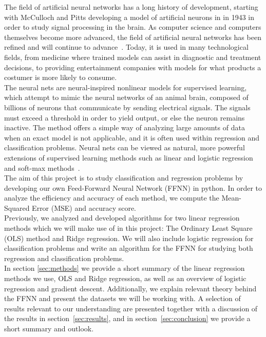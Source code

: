 \documentclass[english,notitlepage,reprint,nofootinbib]{revtex4-2}  %
\begin{document}
The field of artificial neural networks has a long history of development, starting with McCulloch and Pitts developing a model of artificial neurons in in 1943 in order to study signal processing in the brain. As computer science and computers themselves become more advanced, the field of artificial neural networks has been refined and will continue to advance~\cite{lecture_notes}. Today, it is used in many technological fields, from medicine where trained models can assist in diagnostic and treatment decisions, to providing entertainment companies with models for what products a costumer is more likely to consume. 
\vspace{3mm}
\\
The neural nets are neural-inspired nonlinear models for supervised learning, which attempt to mimic the neural networks of an animal brain, composed of billions of neurons that communicate by sending electrical signals. The signals must exceed a threshold in order to yield output, or else the neuron remains inactive. 
The method offers a simple way of analyzing large amounts of data when an exact model is not applicable, and it is often used within regression and classification problems. Neural nets can be viewed as natural, more powerful extensions of supervised learning methods such as linear and logistic regression and soft-max methods~\cite{lecture_notes}. 
\vspace{3mm}
\\
The aim of this project is to study classification and regression problems by developing our own Feed-Forward Neural Network (FFNN) in python. 
In order to analyze the efficiency and accuracy of each method, we compute the Mean-Squared Error (MSE) and accuracy score. 
\vspace{3mm}
\\
Previously, we analyzed and developed algorithms for two linear regression methods which we will make use of in this project: The Ordinary Least Square (OLS) method and Ridge regression. We will also include logistic regression for classification problems and write an algorithm for the FFNN for studying both regression and classification problems. 
\vspace{3mm}
\\
In section \ref{sec:methods} we provide a short summary of the linear regression methods we use, OLS and Ridge regression, as well as an overview of logistic regression and gradient descent. Additionally, we explain relevant theory behind the FFNN and present the datasets we will be working with. 
A selection of results relevant to our understanding are presented together with a discussion of the results in section~\ref{sec:results}, 
and in section~\ref{sec:conclusion} we provide a short summary and outlook. 
\end{document}
